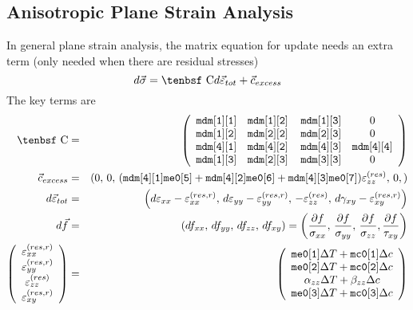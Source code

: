 \documentclass[11pt]{article}
\def\a#1{\alpha_{#1}}
\def\b#1{\beta_{#1}}
\def\C{\hbox{\tenbsf C}}
\def\cex{\vec{c}_{excess}}
\def\code#1{{\small\tt #1}}
\def\deff{d \vec{\varepsilon}_{tot}}
\def\df{d \vec{f}}
\def\dsig{d \vec{\sigma}}
\def\DT{\Delta T}
\def\e#1{\varepsilon_{#1}}
\def\er#1{\varepsilon_{#1}^{(res)}}
\def\err#1{\varepsilon_{#1}^{(res,r)}}
\def\g#1{\gamma_{#1}}
\begin{document}
\subsection{Anisotropic Plane Strain Analysis}

In general plane strain analysis, the matrix equation for update needs an extra term (only needed when there are residual stresses)
\begin{equation}
    \dsig = \C \deff +\cex
\end{equation}
The key terms are
\begin{eqnarray}
      \C & = & \left(\begin{array}{cccc} \code{mdm[1][1]}  & \code{mdm[1][2]}  & \thinspace\code{mdm[1][3]}  & 0   \\
                    \code{mdm[1][2]}  & \code{mdm[2][2]}  & \thinspace\code{mdm[2][3]}  & 0 \\
                            \code{mdm[4][1]}  & \code{mdm[4][2]}  & \thinspace\code{mdm[4][3]}  & \code{mdm[4][4]}  \\
                 \code{mdm[1][3]}  & \code{mdm[2][3]}  & \thinspace\code{mdm[3][3]}  & 0 \end{array}\right)  \\
      \cex & = & (0, \thinspace 0, \thinspace (\code{mdm[4][1]}\code{me0[5]}
              + \code{mdm[4][2]}\code{me0[6]}+\code{mdm[4][3]}\code{me0[7]})\er{zz}, \thinspace 0,) \\
      \deff & = & \left(d\e{xx} - \err{xx}, \thinspace d\e{yy} - \err{yy}, \thinspace -  \er{zz}, 
              \thinspace d\g{xy}-\err{xy}\right) \\
      \df & = & (df_{xx}, \thinspace df_{yy}, \thinspace df_{zz}, \thinspace df_{xy})
                  = \left({\partial f\over \sigma_{xx}}, \thinspace {\partial f\over \sigma_{yy}}, \thinspace {\partial f\over \sigma_{zz}},
                                {\partial f\over \tau_{xy}}\right)  \\
\left(\begin{array}{c} \err{xx} \\ \err{yy} \\ \er{zz} \\ \err{xy} \end{array}\right)
       & = &  \left(\begin{array}{c}
	\code{me0[1]}\DT + \code{mc0[1]}\Delta c \\
	\code{me0[2]}\DT + \code{mc0[2]}\Delta c \\
	\a{zz}\DT + \b{zz}\Delta c \\
	\code{me0[3]}\DT + \code{mc0[3]}\Delta c  \end{array}\right) 
 \end{eqnarray}
\end{document}
